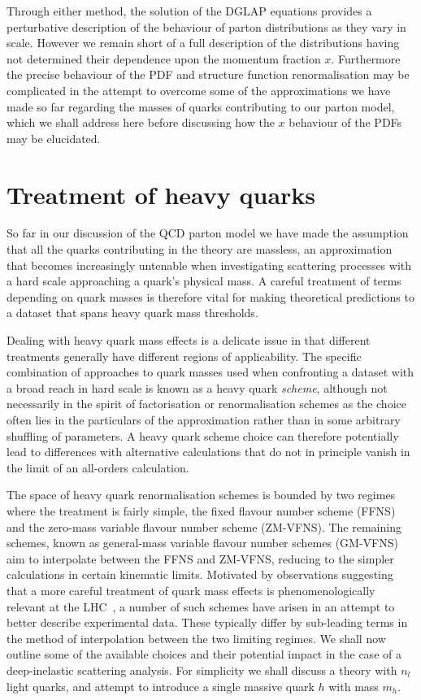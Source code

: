 Through either method, the solution of the DGLAP equations provides a perturbative description of the behaviour of parton distributions as they vary in scale. However we remain short of a full description of the distributions having not determined their dependence upon the momentum fraction $x$. Furthermore the precise behaviour of the PDF and structure function renormalisation may be complicated in the attempt to overcome some of the approximations we have made so far regarding the masses of quarks contributing to our parton model, which we shall address here before discussing how the $x$ behaviour of the PDFs may be elucidated.
\clearpage
\section{Treatment of heavy quarks}
So far in our discussion of the QCD parton model we have made the assumption that all the quarks contributing in the theory are massless, an approximation that becomes increasingly untenable when investigating scattering processes with a hard scale approaching a quark's physical mass. A careful treatment of terms depending on quark masses is therefore vital for making theoretical predictions to a dataset that spans heavy quark mass thresholds. 

Dealing with heavy quark mass effects is a delicate issue in that different treatments generally have different regions of applicability. The specific combination of approaches to quark masses used when confronting a dataset with a broad reach in hard scale is known as a heavy quark \emph{scheme}, although not necessarily in the spirit of factorisation or renormalisation schemes as the choice often lies in the particulars of the approximation rather than in some arbitrary shuffling of parameters. A heavy quark scheme choice can therefore potentially lead to differences with alternative calculations that do not in principle vanish in the limit of an all-orders calculation.

The space of heavy quark renormalisation schemes is bounded by two regimes where the treatment is fairly simple, the fixed flavour number scheme (FFNS) and the zero-mass variable flavour number scheme (ZM-VFNS). The remaining schemes, known as general-mass variable flavour number schemes (GM-VFNS) aim to interpolate between the FFNS and ZM-VFNS, reducing to the simpler calculations in certain kinematic limits. Motivated by observations suggesting that a more careful treatment of quark mass effects is phenomenologically relevant at the LHC~\cite{Tung:2006tb}, a number of such schemes have arisen in an attempt to better describe experimental data. These typically differ by sub-leading terms in the method of interpolation between the two limiting regimes. We shall now outline some of the available choices and their potential impact in the case of a deep-inelastic scattering analysis. For simplicity we shall discuss a theory with $n_l$ light quarks, and attempt to introduce a single massive quark $h$ with mass $m_h$.

